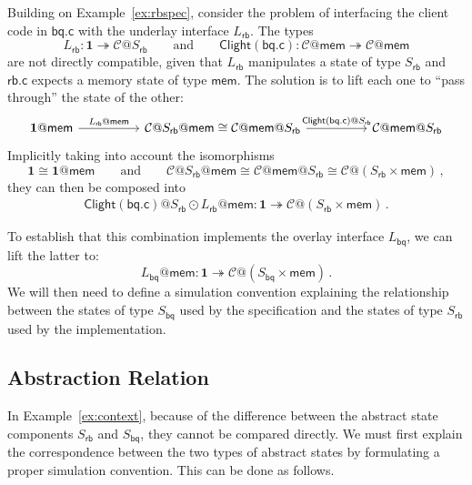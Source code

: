 \documentclass[acmsmall,screen,review,anonymous]{acmart}
\newcommand{\kw}[1]{\ensuremath{ \mathsf{#1} }}
\begin{document}
\begin{example}[Interfacing $L_\kw{rb}$ with client code] \label{ex:context}
Building on Example~\ref{ex:rbspec},
consider the problem of interfacing
the client code in $\kw{bq.c}$ with the underlay interface $L_\kw{rb}$.
The types
\[
  L_\kw{rb} : \mathbf{1} \twoheadrightarrow \mathcal{C}@S_\kw{rb}
  \qquad
  \text{and}
  \qquad
  \kw{Clight}(\kw{bq.c}) : \mathcal{C}@\kw{mem} \twoheadrightarrow \mathcal{C}@\kw{mem}
\]
are not directly compatible,
given that $L_\kw{rb}$ manipulates a state of type $S_\kw{rb}$
and $\kw{rb.c}$ expects a memory state of type $\kw{mem}$.
The solution is to lift each one to ``pass through''
the state of the other:
\[
  \begin{tikzcd}[column sep=huge]
    \mathbf{1}@\kw{mem}
    \ar[r, "L_\kw{rb}@\kw{mem}"] &
    \mathcal{C}@S_\kw{rb}@\kw{mem} \cong
    \mathcal{C}@\kw{mem}@S_\kw{rb}
    \ar[r, "\kw{Clight}(\kw{bq.c})@S_\kw{rb}"] &
    \mathcal{C}@\kw{mem}@S_\kw{rb}
  \end{tikzcd}
\]
Implicitly taking into account the isomorphisms
\[
  \mathbf{1} \cong \mathbf{1}@\kw{mem}
  \qquad
  \text{and}
  \qquad
  \mathcal{C}@S_\kw{rb}@\kw{mem} \cong
  \mathcal{C}@\kw{mem}@S_\kw{rb} \cong
  \mathcal{C}@(S_\kw{rb} \times \kw{mem})
  \,,
\]
they can then be composed into
\begin{gather*}
  \kw{Clight}(\kw{bq.c})@S_\kw{rb} \odot
  L_\kw{rb}@\kw{mem} :
  \mathbf{1} \twoheadrightarrow \mathcal{C}@(S_\kw{rb} \times \kw{mem})
  \,.
\end{gather*}

To establish that this combination implements the overlay interface $L_\kw{bq}$,
we can lift the latter to:
\[
  L_\kw{bq}@\kw{mem} : \mathbf{1} \twoheadrightarrow
    \mathcal{C}@(S_\kw{bq} \times \kw{mem})
  \,.
\]
We will then need to define a simulation convention
explaining the relationship between
the states of type $S_\kw{bq}$ used by the specification and
the states of type $S_\kw{rb}$ used by the implementation.


\subsection{Abstraction Relation} \label{sec:basic:abrel} %

In Example~\ref{ex:context},
because of the difference between
the abstract state components $S_\kw{rb}$ and $S_\kw{bq}$,
they cannot be compared directly.
We must first explain the correspondence between
the two types of abstract states
by formulating a proper simulation convention.
This can be done as follows.
\end{example}
\end{document}
